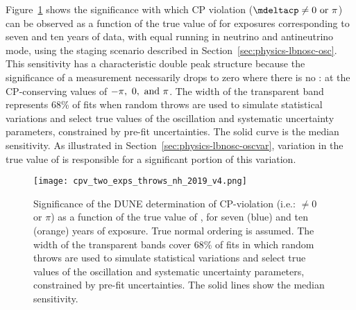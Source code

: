 Figure~\ref{fig:cpv_nominal} shows the significance with which CP
violation ($\mdeltacp \neq 0 \ {\rm or} \ \pi$) can be observed as a
function of the true value of \deltacp for exposures corresponding to seven and ten years of data, with equal running in neutrino and antineutrino mode, using the staging scenario described in Section~\ref{sec:physics-lbnosc-osc}.
This sensitivity has a characteristic double peak
structure because the significance of a  measurement
necessarily drops to zero where there is no : at the
CP-conserving values of $-\pi,~0,~{\rm and}~\pi$. The width of the transparent band represents 68\% of fits when random throws are used to simulate statistical variations and select true values of the oscillation and systematic uncertainty parameters, constrained by pre-fit uncertainties. The solid curve is the median sensitivity. As illustrated in Section~\ref{sec:physics-lbnosc-oscvar}, variation in the true value of  is responsible for a significant portion of this variation.

\begin{figure}[h!]
    \centering
		\texttt{[image: cpv\_two\_exps\_throws\_nh\_2019\_v4.png]}
	\caption[Significance of the DUNE determination of CP-violation as a function of \deltacp]{Significance of the DUNE determination of CP-violation (i.e.: \deltacp $\neq 0$ or $\pi$) as a function of the true value of \deltacp, for seven (blue) and ten (orange) years of exposure. True normal ordering is assumed. The width of the transparent bands cover 68\% of fits in which random throws are used to simulate statistical variations and select true values of the oscillation and systematic uncertainty parameters, constrained by pre-fit uncertainties. The solid lines show the median sensitivity.}
    \label{fig:cpv_nominal}
\end{figure}

